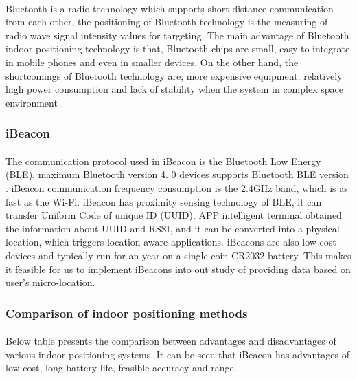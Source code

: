 \documentclass[12pt]{article}
\begin{document}
\paragraph{}Bluetooth is a radio technology which supports short distance communication from each other, the positioning of Bluetooth technology is the measuring of radio wave signal intensity values for targeting. The main advantage of Bluetooth indoor positioning technology is that, Bluetooth chips are small, easy to integrate in mobile phones and even in smaller devices. On the other hand, the shortcomings of Bluetooth technology are; more expensive equipment, relatively high power consumption and lack of stability when the system in complex space environment \cite{indoor}.

\subsubsection{iBeacon}
\paragraph{}The communication protocol used in iBeacon is the Bluetooth Low Energy (BLE), maximum Bluetooth version 4. 0 devices supports Bluetooth BLE version \cite{indoor}. iBeacon communication frequency consumption is the 2.4GHz band, which is as fast as the Wi-Fi. iBeacon has proximity sensing technology of BLE, it can transfer Uniform Code of unique ID (UUID), APP intelligent terminal obtained the information about UUID and RSSI, and it can be converted into a physical location, which triggers location-aware applications. iBeacons are also low-cost devices and typically run for an year on a single coin CR2032 battery. This makes it feasible for us to implement iBeacons into out study of providing data based on user's micro-location.

\subsubsection{Comparison of indoor positioning methods}
\paragraph{} Below table presents the comparison between advantages and disadvantages of various indoor positioning systems. It can be seen that iBeacon has advantages of low cost, long battery life, feasible accuracy and range. 
\paragraph{}
\end{document}
